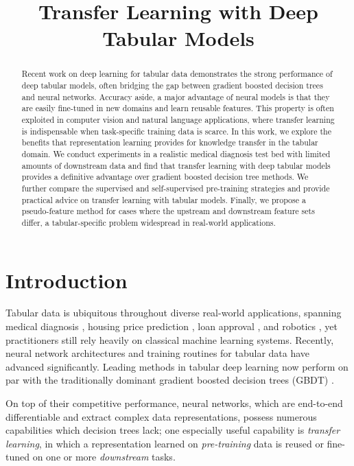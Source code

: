 \title{Transfer Learning with Deep Tabular Models}

\begin{abstract}
Recent work on deep learning for tabular data demonstrates the strong performance of deep tabular models, often bridging the gap between gradient boosted decision trees and neural networks. Accuracy aside, a major advantage of neural models is that they are easily fine-tuned in new domains and learn reusable features. This property is often exploited in computer vision and natural language applications, where transfer learning is indispensable when task-specific training data is scarce. In this work, we explore the benefits that representation learning provides for knowledge transfer in the tabular domain. We conduct experiments in a realistic medical diagnosis test bed with limited amounts of downstream data and find that transfer learning with deep tabular models provides a definitive advantage over gradient boosted decision tree methods. We further compare the supervised and self-supervised pre-training strategies and provide practical advice on transfer learning with tabular models. Finally, we propose a pseudo-feature method for cases where the upstream and downstream feature sets differ, a tabular-specific problem widespread in real-world applications.
\end{abstract}

\section{Introduction}
\label{sec:introduction}

Tabular data is ubiquitous throughout diverse real-world applications, spanning medical diagnosis \citep{johnson2016mimic}, housing price prediction \citep{afonso2019housing}, loan approval \citep{arun2016loan}, and robotics \citep{wienke2018model}, yet practitioners still rely heavily on classical machine learning systems. Recently, neural network architectures and training routines for tabular data have advanced significantly. Leading methods in tabular deep learning \citep{gorishniy2021revisiting, gorishniy2022embeddings, somepalli2021saint, kossen2021self} now perform on par with the traditionally dominant gradient boosted decision trees (GBDT)  \citep{friedman2001greedy, prokhorenkova2018catboost, chen2016xgboost, ke2017lightgbm}.

On top of their competitive performance, neural networks, which are end-to-end differentiable and extract complex data representations, possess numerous capabilities which decision trees lack;  one especially useful capability is \emph{transfer learning}, in which a representation learned on \emph{pre-training} data is reused or fine-tuned on one or more \emph{downstream} tasks.

